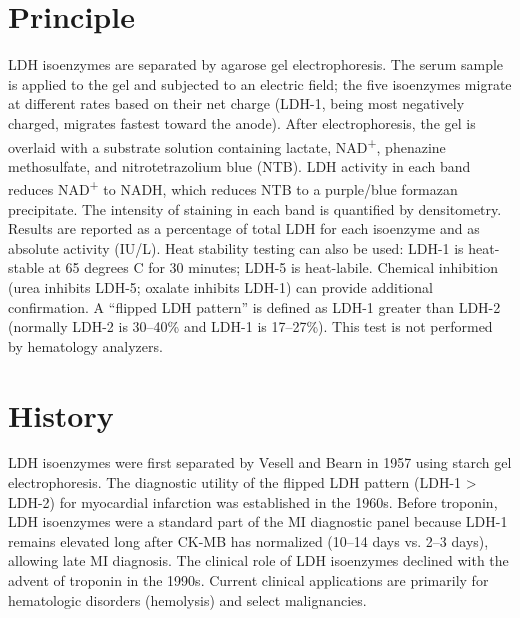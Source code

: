 \section*{Principle}
LDH isoenzymes are separated by agarose gel electrophoresis. The serum sample is applied to the gel and subjected to an electric field; the five isoenzymes migrate at different rates based on their net charge (LDH-1, being most negatively charged, migrates fastest toward the anode). After electrophoresis, the gel is overlaid with a substrate solution containing lactate, NAD\textsuperscript{+}, phenazine methosulfate, and nitrotetrazolium blue (NTB). LDH activity in each band reduces NAD\textsuperscript{+} to NADH, which reduces NTB to a purple/blue formazan precipitate. The intensity of staining in each band is quantified by densitometry. Results are reported as a percentage of total LDH for each isoenzyme and as absolute activity (IU/L). Heat stability testing can also be used: LDH-1 is heat-stable at 65 degrees C for 30 minutes; LDH-5 is heat-labile. Chemical inhibition (urea inhibits LDH-5; oxalate inhibits LDH-1) can provide additional confirmation. A ``flipped LDH pattern'' is defined as LDH-1 greater than LDH-2 (normally LDH-2 is 30--40\% and LDH-1 is 17--27\%). This test is not performed by hematology analyzers.

\section*{History}
LDH isoenzymes were first separated by Vesell and Bearn in 1957 using starch gel electrophoresis. The diagnostic utility of the flipped LDH pattern (LDH-1 > LDH-2) for myocardial infarction was established in the 1960s. Before troponin, LDH isoenzymes were a standard part of the MI diagnostic panel because LDH-1 remains elevated long after CK-MB has normalized (10--14 days vs. 2--3 days), allowing late MI diagnosis. The clinical role of LDH isoenzymes declined with the advent of troponin in the 1990s. Current clinical applications are primarily for hematologic disorders (hemolysis) and select malignancies.

